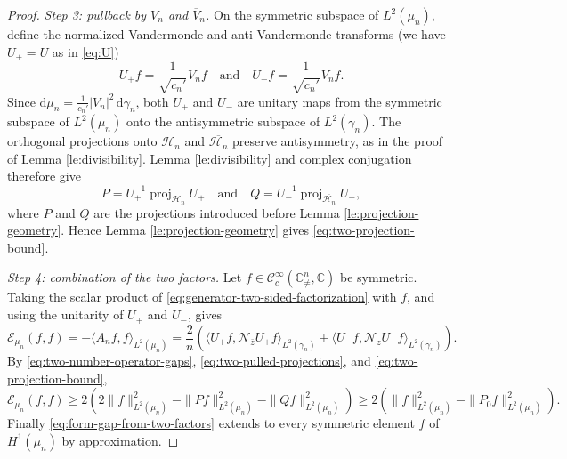 \documentclass[11pt,reqno]{amsart}
\numberwithin{equation}{section}%
\numberwithin{figure}{section}%
\numberwithin{table}{section}
\theoremstyle{plain}
\theoremstyle{definition}
\begin{document}
\begin{proof}
\medskip

\noindent\emph{Step 3: pullback by $V_n$ and $\overline V_n$.}
On the symmetric subspace of $L^2(\mu_n)$, define the normalized Vandermonde
and anti-Vandermonde transforms (we have $U_+=U$ as in \eqref{eq:U})
\begin{equation}
  U_+f = \frac{1}{\sqrt{c_n'}}V_nf
  \quad\text{and}\quad
  U_-f = \frac{1}{\sqrt{c_n'}}\overline V_nf.
\end{equation}
Since $\mathrm{d}\mu_n=\frac{1}{c_n'}|V_n|^2\,\mathrm{d}\gamma_n$, both $U_+$
and $U_-$ are unitary maps from the symmetric subspace of $L^2(\mu_n)$ onto
the antisymmetric subspace of $L^2(\gamma_n)$. The orthogonal projections onto
$\mathcal{H}_n$ and $\overline{\mathcal{H}_n}$ preserve antisymmetry, as in
the proof of Lemma \ref{le:divisibility}. Lemma \ref{le:divisibility} and
complex conjugation therefore give
\begin{equation}\label{eq:two-pulled-projections}
  P = U_+^{-1}\operatorname{proj}_{\mathcal{H}_n}U_+
  \quad\text{and}\quad
  Q = U_-^{-1}\operatorname{proj}_{\overline{\mathcal{H}_n}}U_-,
\end{equation}
where $P$ and $Q$ are the projections introduced before Lemma
\ref{le:projection-geometry}. Hence Lemma \ref{le:projection-geometry} gives
\eqref{eq:two-projection-bound}.

\medskip

\noindent\emph{Step 4: combination of the two factors.}
Let
$f\in\mathcal{C}_c^\infty(\mathbb{C}^n_{\neq},\mathbb{C})$
be symmetric. Taking the scalar product of
\eqref{eq:generator-two-sided-factorization} with $f$, and using the
unitarity of $U_+$ and $U_-$, gives
\begin{equation}
  \mathcal{E}_{\mu_n}(f,f)
  =-\langle A_nf,f\rangle_{L^2(\mu_n)}
  =\frac{2}{n}\left(
    \langle U_+f,\mathcal{N}_{\bar z}U_+f\rangle_{L^2(\gamma_n)}
    +
    \langle U_-f,\mathcal{N}_{z}U_-f\rangle_{L^2(\gamma_n)}
  \right).
  \label{eq:form-from-two-factors}
\end{equation}
By \eqref{eq:two-number-operator-gaps},
\eqref{eq:two-pulled-projections}, and
\eqref{eq:two-projection-bound},
\begin{equation}
  \mathcal{E}_{\mu_n}(f,f)
  \geq
  2\left(
    2\|f\|_{L^2(\mu_n)}^2
    -\|Pf\|_{L^2(\mu_n)}^2
    -\|Qf\|_{L^2(\mu_n)}^2
  \right)
  \geq
  2\left(
    \|f\|_{L^2(\mu_n)}^2
    -\|P_0f\|_{L^2(\mu_n)}^2
  \right).
  \label{eq:form-gap-from-two-factors}
\end{equation}
Finally \eqref{eq:form-gap-from-two-factors} extends to every symmetric
element $f$ of $H^1(\mu_n)$ by approximation.


\end{proof}
\end{document}
